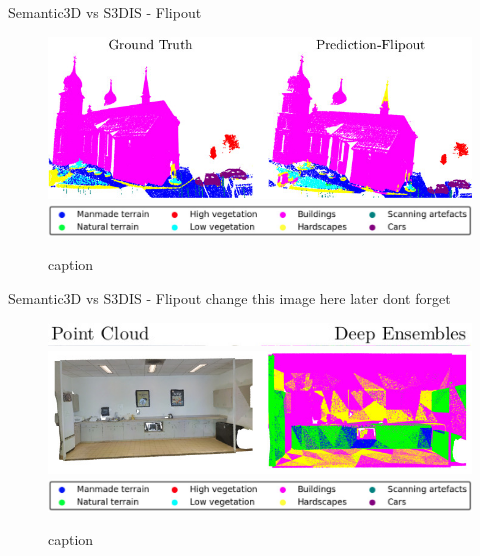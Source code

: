\documentclass[aspectratio=169]{beamer}
\begin{document}
\begin{frame}{Semantic3D vs S3DIS - Flipout}
    \begin{figure}
        \centering
        \includegraphics[scale=0.5]{images/sem3d/Sem3d_Fout_op.jpg}
        \includegraphics[scale=0.25]{images/legend.jpg}
        \caption{caption}
        \label{fig:sem3d_fout_op}
    \end{figure}
\end{frame}
\begin{frame}{Semantic3D vs S3DIS - Flipout}
    change this image here later dont forget
    \begin{figure}
        \centering
        \includegraphics[scale=0.5]{images/s3dis/top_legend_s3dis_DE.jpg}
        \includegraphics[scale=0.5]{images/s3dis/S3DIS_DE_output.jpg}
        \includegraphics[scale=0.25]{images/legend.jpg}
        \caption{caption}
        \label{fig:s3dis_fout_op}
    \end{figure}
\end{frame}
\end{document}
